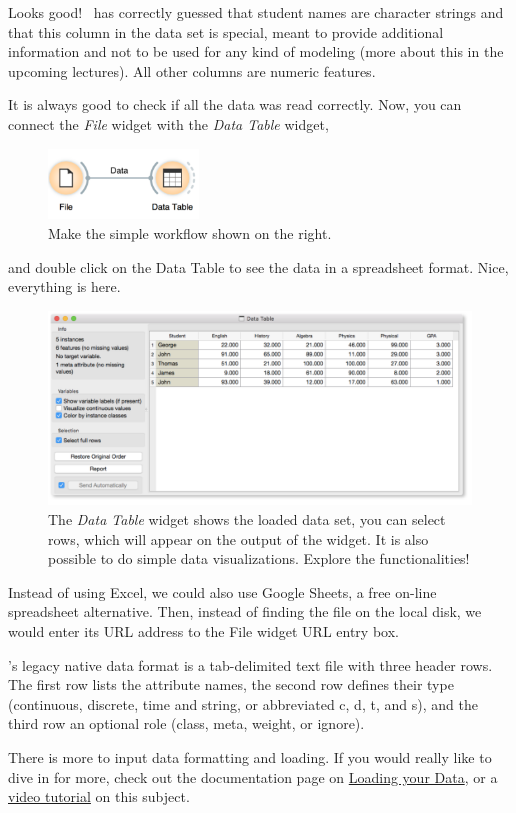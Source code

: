 Looks good! \mutation\ has correctly guessed that student names are character strings and that this column in the data set is special, meant to provide additional information and not to be used for any kind of modeling (more about this in the upcoming lectures). All other columns are numeric features.

It is always good to check if all the data was read correctly. Now, you can connect the \textit{File} widget with the \textit{Data Table} widget,

\begin{figure}[h]
  \centering
  \includegraphics[width=40mm]{loading-fig3.png}%
  \caption{Make the simple workflow shown on the right.}
\label{fig:loading-fig3}
\end{figure}

\noindent and double click on the Data Table to see the data in a spreadsheet format.
Nice, everything is here. 

\begin{figure}[h]
  \centering
  \includegraphics[width=\linewidth]{loading-fig4.png}%
  \caption{The \textit{Data Table} widget shows the loaded data set, you can select rows, which will appear on the output of the widget. It is also possible to do simple data visualizations. Explore the functionalities!}
  \label{fig:loading-fig4}
\end{figure}

Instead of using Excel, we could also use Google Sheets, a free on-line spreadsheet alternative. Then, instead of finding the file on the local disk, we would enter its URL address to the File widget URL entry box.

\mutation’s legacy native data format is a tab-delimited text file with three header rows. The first row lists the attribute names, the second row defines their type (continuous, discrete, time and string, or abbreviated c, d, t, and s), and the third row an optional role (class, meta, weight, or ignore).

There is more to input data formatting and loading. If you would really like to dive in for more, check out the documentation page on \href{https://orange-visual-programming.readthedocs.io/loading-your-data/index.html}{Loading your Data}, or a \href{https://www.youtube.com/watch?v=MHcGdQeYCMg}{video tutorial} on this subject.
